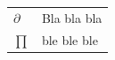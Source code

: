\thispagestyle{empty}
\begin{thesissymbols}
\begin{normalsize}
\begin{longtable}[l]{p{2cm}l}
  $\partial$   \dotfill  & Bla bla bla \\
  $\prod$       \dotfill & ble ble ble \\
    
\end{longtable}
\end{normalsize}
\end{thesissymbols}
